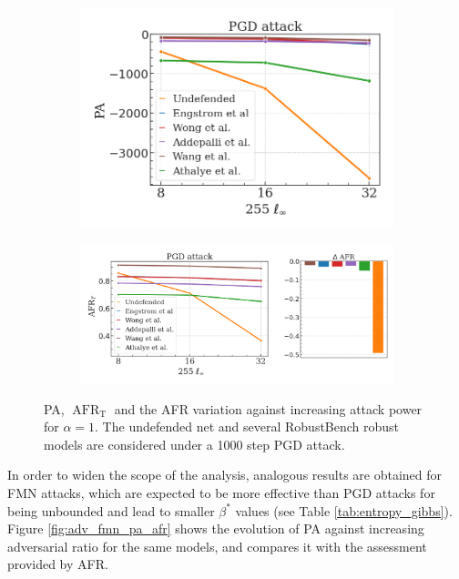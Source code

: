 \begin{figure}[b]
    \centering
    \begin{subfigure}[b]{0.37\textwidth}
        \centering
        \includegraphics[width=\textwidth]{img/results_discussion/adversarial/PGD_logPA_eps.png}
    \end{subfigure}
    \hfill
    \begin{subfigure}[b]{0.59\textwidth}
        \centering
        \includegraphics[width=\textwidth]{img/results_discussion/adversarial/PGD_AFR_true_eps_diff.png}
    \end{subfigure}
    \caption{PA, $\operatorname{AFR}_\text{T}$ and the AFR variation against increasing attack power for  $\alpha = 1$. 
    The undefended net and several RobustBench robust models are considered
    under a 1000 step PGD attack.}
    \label{fig:pgd_eps}
\end{figure}

In order to widen the scope of the analysis, analogous results are obtained for
FMN attacks, which are expected to be more effective than PGD attacks for being 
unbounded and lead to smaller $\beta^{*}$ values (see 
Table \ref{tab:entropy_gibbs}). Figure \ref{fig:adv_fmn_pa_afr} shows the evolution 
of PA against increasing adversarial ratio for the same models, and compares
it with the assessment provided by AFR.


